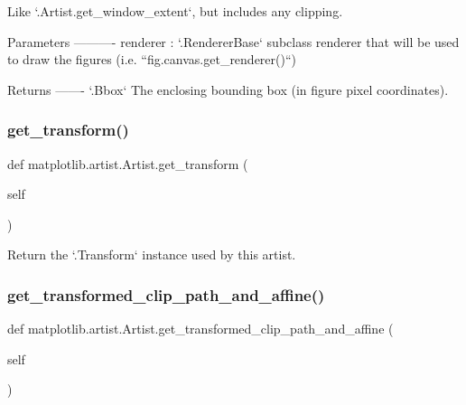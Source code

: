 \begin{DoxyVerb}Like `.Artist.get_window_extent`, but includes any clipping.

Parameters
----------
renderer : `.RendererBase` subclass
    renderer that will be used to draw the figures (i.e.
    ``fig.canvas.get_renderer()``)

Returns
-------
`.Bbox`
    The enclosing bounding box (in figure pixel coordinates).
\end{DoxyVerb}
 \mbox{\label{classmatplotlib_1_1artist_1_1Artist_a36f2b843b163d554fccc6db802d85fbb}} 
\subsubsection{\texorpdfstring{get\+\_\+transform()}{get\_transform()}}
{\footnotesize\ttfamily def matplotlib.\+artist.\+Artist.\+get\+\_\+transform (\begin{DoxyParamCaption}\item[{}]{self }\end{DoxyParamCaption})}

\begin{DoxyVerb}Return the `.Transform` instance used by this artist.\end{DoxyVerb}
 \mbox{\label{classmatplotlib_1_1artist_1_1Artist_a630123b5eb889fc9da7799f3a2faf0bb}} 
\subsubsection{\texorpdfstring{get\+\_\+transformed\+\_\+clip\+\_\+path\+\_\+and\+\_\+affine()}{get\_transformed\_clip\_path\_and\_affine()}}
{\footnotesize\ttfamily def matplotlib.\+artist.\+Artist.\+get\+\_\+transformed\+\_\+clip\+\_\+path\+\_\+and\+\_\+affine (\begin{DoxyParamCaption}\item[{}]{self }\end{DoxyParamCaption})}

